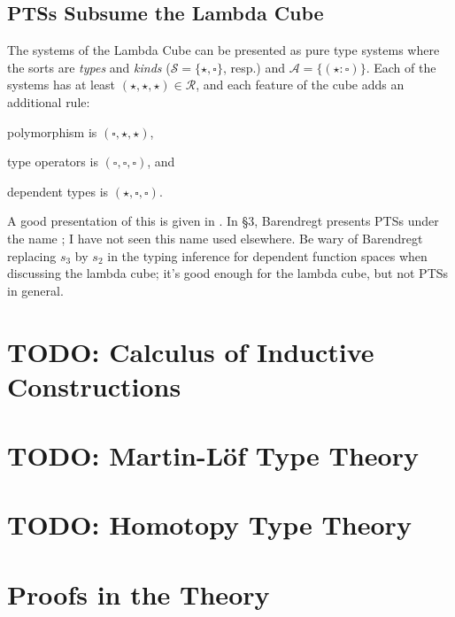 \documentclass[11pt]{article} %
\theoremstyle{definition}
\theoremstyle{remark}
\begin{document}
\subsection{PTSs Subsume the Lambda Cube}
The systems of the Lambda Cube can be presented as pure type systems where the sorts are \textit{types} and \textit{kinds} ($\mathcal S = \{\star, \square\}$, resp.) and $\mathcal A = \{(\star : \square)\}$.
Each of the systems has at least $(\star, \star, \star) \in \mathcal R$, and each feature of the cube adds an additional rule:
\begin{enumerate*}[label=\textit{\roman*})]
\item polymorphism is $(\square,\star,\star)$,
\item type operators is $(\square,\square,\square)$, and
\item dependent types is $(\star,\square,\square)$.
\end{enumerate*}

A good presentation of this is given in \cite{barendregt_1991}.
In \S3, Barendregt presents PTSs under the name ; I have not seen this name used elsewhere.
Be wary of Barendregt replacing $s_3$ by $s_2$ in the typing inference for dependent function spaces when discussing the lambda cube; it's good enough for the lambda cube, but not PTSs in general.

\section{TODO: Calculus of Inductive Constructions}
\section{TODO: Martin-L\"of Type Theory}
\section{TODO: Homotopy Type Theory}

\section{Proofs in the Theory}
\end{document}
